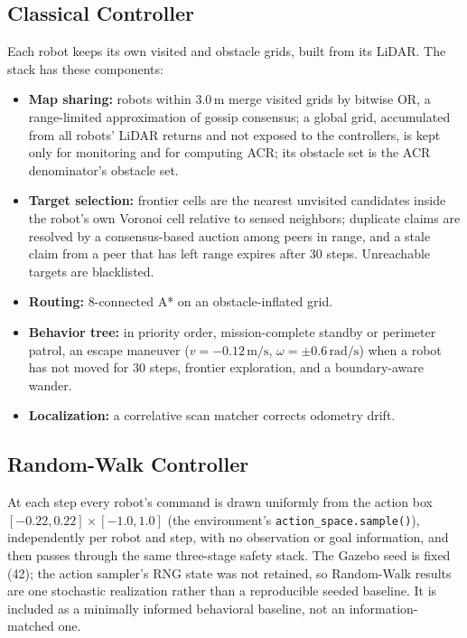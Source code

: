 \documentclass[conference]{IEEEtran}
\newcommand{\si}[1]{\mathrm{#1}}
\begin{document}
\subsection{Classical Controller}
Each robot keeps its own visited and obstacle grids, built from its LiDAR. The
stack has these components:
\begin{itemize}
  \item \textbf{Map sharing:} robots within $3.0\,\si{m}$ merge visited grids by
        bitwise OR, a range-limited approximation of gossip consensus; a global
        grid, accumulated from all robots' LiDAR returns and not exposed to the controllers, is kept only for monitoring and for computing ACR; its obstacle set is the ACR denominator's obstacle set.
  \item \textbf{Target selection:} frontier cells are the nearest unvisited
        candidates inside the robot's own Voronoi cell relative to sensed
        neighbors; duplicate claims are resolved by a consensus-based auction among
        peers in range, and a stale claim from a peer that has left range
        expires after 30 steps. Unreachable targets are blacklisted.
  \item \textbf{Routing:} 8-connected A* on an obstacle-inflated grid.
  \item \textbf{Behavior tree:} in priority order, mission-complete standby or
        perimeter patrol, an escape maneuver ($v=-0.12\,\si{m/s}$,
        $\omega=\pm0.6\,\si{rad/s}$) when a robot has not moved for 30 steps,
        frontier exploration, and a boundary-aware wander.
  \item \textbf{Localization:} a correlative scan matcher corrects odometry drift.
\end{itemize}

\subsection{Random-Walk Controller}
At each step every robot's command is drawn uniformly from the action box $[-0.22,0.22]\times[-1.0,1.0]$ (the environment's \texttt{action\_space.sample()}), independently per robot and step, with no observation or goal information, and then passes through the same three-stage safety stack. The Gazebo seed is fixed (42); the action sampler's RNG state was not retained, so Random-Walk results are one stochastic realization rather than a reproducible seeded baseline. It is included as a minimally informed behavioral baseline, not an information-matched one.
\end{document}
